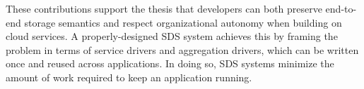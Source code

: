 These contributions support the thesis that developers can both preserve
end-to-end storage semantics and respect organizational autonomy when building
on cloud services.  A properly-designed SDS system achieves this by framing the
problem in terms of service drivers and aggregation drivers, which can be
written once and reused across applications.  In doing so, SDS systems minimize the amount of
work required to keep an application running.



